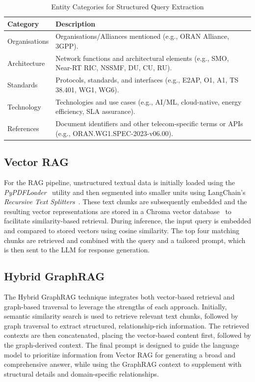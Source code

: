 \documentclass[10pt, conference]{IEEEtran}
\begin{document}
\begin{table}[htbp]
\caption{Entity Categories for Structured Query Extraction}
\vspace{-0.1 in}
\label{entity_examples}
\small
\begin{center}
\renewcommand{\arraystretch}{1.3}
\begin{tabular}{p{2cm}p{5cm}}
\hline
\textbf{Category} & \textbf{Description} \\
\hline
    Organisations & Organisations/Alliances mentioned (e.g., ORAN Alliance, 3GPP). \\
    Architecture & Network functions and architectural elements (e.g., SMO, Near-RT RIC, NSSMF, DU, CU, RU). \\
    Standards & Protocols, standards, and interfaces (e.g., E2AP, O1, A1, TS 38.401, WG1, WG6). \\
    Technology & Technologies and use cases (e.g., AI/ML, cloud-native, energy efficiency, SLA assurance). \\
    References & Document identifiers and other telecom-specific terms or APIs (e.g., ORAN.WG1.SPEC-2023-v06.00). \\
\hline
\end{tabular}
\label{tab1}
\end{center}
\end{table}

\subsection{Vector RAG}
For the RAG pipeline, unstructured textual data is initially loaded using the \textit{PyPDFLoader}~\cite{langchain_pypdfloader} utility and then segmented into smaller units using LangChain’s \textit{Recursive Text Splitters}~\cite{recursive_character_text_splitter}. These text chunks are subsequently embedded and the resulting vector representations are stored in a Chroma vector database~\cite{chroma2025} to facilitate similarity-based retrieval.  During inference, the input query is embedded and compared to stored vectors using cosine similarity. The top four matching chunks are retrieved and combined with the query and a tailored prompt, which is then sent to the LLM for response generation.

\subsection{Hybrid GraphRAG}
The Hybrid GraphRAG technique integrates both vector-based retrieval and graph-based traversal to leverage the strengths of each approach. Initially, semantic similarity search is used to retrieve relevant text chunks, followed by graph traversal to extract structured, relationship-rich information. The retrieved contexts are then concatenated, placing the vector-based content first, followed by the graph-derived context. The final prompt is designed to guide the language model to prioritize information from Vector RAG for generating a broad and comprehensive answer, while using the GraphRAG context to supplement with structural details and domain-specific relationships.
\end{document}
